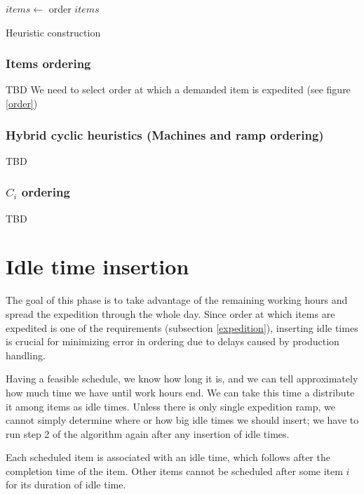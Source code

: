 \documentclass{ctuthesis}
\begin{document}
\begin{algorithm}[H]
\SetAlgoLined
{}
  $items \leftarrow$ order $items$\;
\caption{Heuristic construction}
\end{algorithm}

\subsubsection{Items ordering}
TBD
We need to select order at which a demanded item is expedited (see figure \ref{order})
\subsubsection{Hybrid cyclic heuristics (Machines and ramp ordering)}
TBD
\subsubsection{$C_i$ ordering}
TBD

\section{Idle time insertion}

The goal of this phase is to take advantage of the remaining working hours and spread the expedition through the whole day. Since order at which items are expedited is one of the requirements (subsection \ref{expedition}), inserting idle times is crucial for minimizing error in ordering due to delays caused by production handling.

Having a feasible schedule, we know how long it is, and we can tell approximately how much time we have until work hours end. We can take this time a distribute it among items as idle times. Unless there is only single expedition ramp, we cannot simply determine where or how big idle times we should insert; we have to run step 2 of the algorithm again after any insertion of idle times.

Each scheduled item is associated with an idle time, which follows after the completion time of the item. Other items cannot be scheduled after some item $i$ for its duration of idle time.
\end{document}
